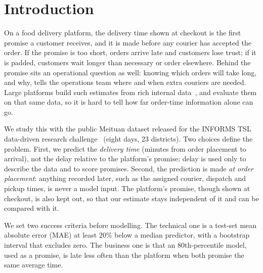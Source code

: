 \section{Introduction}

On a food delivery platform, the delivery time shown at checkout is the first promise a customer
receives, and it is made before any courier has accepted the order. If the promise is too short, orders
arrive late and customers lose trust; if it is padded, customers wait longer than necessary or order
elsewhere. Behind the promise sits an operational question as well: knowing which orders will take
long, and why, tells the operations team where and when extra couriers are needed. Large platforms
build such estimates from rich internal data~\cite{zhu2020fulfillment}, and evaluate them on that same data,
so it is hard to tell how far order-time information alone can go.

We study this with the public Meituan dataset released for the INFORMS TSL data-driven research
challenge~\cite{zhao2024meituan} (eight days, 23 districts). Two choices define the problem. First, we predict the \emph{delivery time} (minutes from
order placement to arrival), not the delay relative to the platform's promise; delay is used only to
describe the data and to score promises. Second, the prediction is made \emph{at order placement}:
anything recorded later, such as the assigned courier, dispatch and pickup times, is never a model
input. The platform's promise, though shown at checkout, is also kept out, so that our estimate stays
independent of it and can be compared with it.

\medskip
\noindent{}
\medskip

We set two success criteria before modelling. The technical one is a test-set mean absolute error (MAE)
at least 20\% below a median predictor, with a bootstrap interval that excludes zero. The business one
is that an 80th-percentile model, used as a promise, is late less often than the platform when both
promise the same average time.

